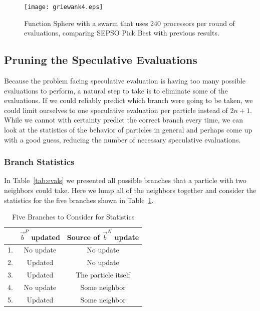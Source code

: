 \documentclass[journal,letterpaper]{IEEEtran}
\providecommand{\pers}{\ensuremath{P}}
\providecommand{\neigh}{\ensuremath{N}}
\providecommand{\nbest}{\ensuremath{\Vec{b}^\neigh}}
\providecommand{\pbest}{\ensuremath{\Vec{b}^\pers}}
\begin{document}
\begin{figure}
  \centering
  \texttt{[image: griewank4.eps]}
  \caption{Function Sphere with a swarm that uses 240 processors per round of
  evaluations, comparing SEPSO Pick Best with previous results.}
  \label{fig:griewank-pickbest}
\end{figure}

\subsection{Pruning the Speculative Evaluations}

Because the problem facing speculative evaluation is having too many possible
evaluations to perform, a natural step to take is to eliminate some of the
evaluations.  If we could reliably predict which branch were going to be taken,
we could limit ourselves to one speculative evaluation per particle instead of
$2n+1$.  While we cannot with certainty predict the correct branch every time,
we can look at the statistics of the behavior of particles in general and
perhaps come up with a good guess, reducing the number of necessary speculative
evaluations.

\subsubsection{Branch Statistics}

In Table~\ref{tab:evals} we presented all possible branches that a particle
with two neighbors could take.  Here we lump all of the neighbors together and
consider the statistics for the five branches shown in Table~\ref{tab:branches}.

\begin{table}[h]
  \caption{Five Branches to Consider for Statistics}
  \label{tab:branches}
  \centering
  \begin{tabular}{rc|c}
	&$\pbest$ updated&Source of $\nbest$ update\\
	\hline
	1.&No update&No update\\
	2.&Updated&No update\\
	3.&Updated&The particle itself\\
	4.&No update&Some neighbor\\
	5.&Updated&Some neighbor\\
  \end{tabular}
\end{table}
\end{document}

